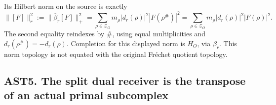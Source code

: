 Its Hilbert norm on the source is exactly \[
\|[F]\|_r^2:=\|\overline\beta_r[F]\|_+^2
=\sum_{\rho\in\mathscr Z_O}m_\rho|d_r(\rho)|^2|F(\rho^\#)|^2
=\sum_{\rho\in\mathscr Z_O}m_\rho|d_r(\rho)|^2|F(\rho)|^2.
\tag{AST4.4}
\] The second equality reindexes by \(\#\), using equal multiplicities
and \(d_r(\rho^\#)=-d_r(\rho)\). Completion for this displayed norm is
\(H_O\), via \(\overline\beta_r\). This norm topology is not equated
with the original Fréchet quotient topology.

\subsection{AST5. The split dual receiver is the transpose of an actual
primal
subcomplex}\label{ast5.-the-split-dual-receiver-is-the-transpose-of-an-actual-primal-subcomplex}

